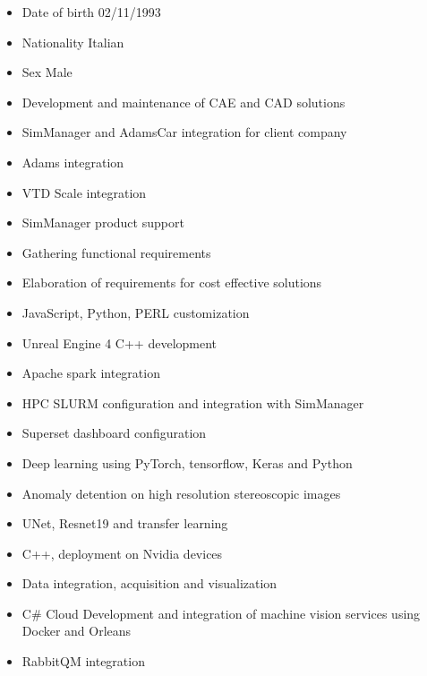 \documentclass[10pt,a4paper,ragged2e,withhyper]{altacv}
\begin{document}
\begin{paracol}{2}

\begin{itemize}
\item Date of birth 02/11/1993
\item Nationality Italian
\item Sex Male
\end{itemize}


\begin{itemize}
\item Development and maintenance of CAE and CAD solutions
\item SimManager and AdamsCar integration for client company
\item Adams integration
\item VTD Scale integration
\item SimManager product support 
\item Gathering functional requirements
\item Elaboration of requirements for cost effective solutions
\item JavaScript, Python, PERL customization
\item Unreal Engine 4 C++ development
\item Apache spark integration
\item HPC SLURM configuration and integration with SimManager
\item Superset dashboard configuration
\end{itemize}

\divider

\begin{itemize}
\item Deep learning using PyTorch, tensorflow, Keras and Python
\item Anomaly detention on high resolution stereoscopic images
\item UNet, Resnet19 and transfer learning
\item C++, deployment on Nvidia devices
\item Data integration, acquisition and visualization
\item C\# Cloud Development and integration of machine vision services using Docker and Orleans
\item RabbitQM integration
\end{itemize}
\newpage
{}


\end{paracol}
\end{document}
